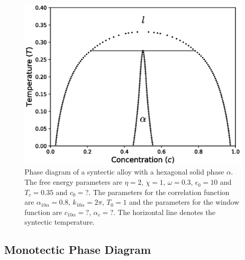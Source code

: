 \documentclass[showkeys, prb, reprint]{revtex4-1}
\begin{document}
\begin{figure}
	\includegraphics[scale=0.5]{syntectic.eps}
    \caption[Syntectic Phase Diagram]{
        \label{syntectic} Phase diagram of a syntectic alloy with a hexagonal
        solid phase $\alpha$. The free energy parameters are $\eta=2$,
        $\chi=1$, $\omega=0.3$, $\epsilon_0 = 10$ and $T_c=0.35$ {\color{red} and $c_0=?$}. The
        parameters for the correlation  function are {\color{red} $\alpha_{10\alpha} = 0.8$,
        $k_{10\alpha} = 2\pi$, $T_0 = 1$  and the parameters for the window
        function are $c_{10\alpha}=?$, $\alpha_c=?$}. The horizontal line denotes the  syntectic temperature.
    }
\end{figure}

\subsection{Monotectic Phase Diagram} %
\end{document}
